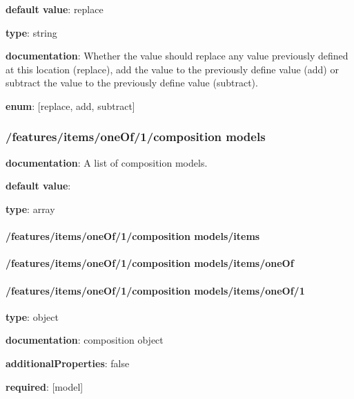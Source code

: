 \begin{itemized}
\item {\bf default value}: replace
\item {\bf type}: string
\item {\bf documentation}: Whether the value should replace any value previously defined at this location (replace), add the value to the previously define value (add) or subtract the value to the previously define value (subtract).
\item {\bf enum}: [replace, add, subtract]\end{itemized}\subsubsection{/features/items/oneOf/1/composition models} \begin{itemized}
\item {\bf documentation}: A list of composition models.
\item {\bf default value}: 
\item {\bf type}: array
\paragraph{/features/items/oneOf/1/composition models/items} \begin{itemized}
\end{itemized}\end{itemized}\paragraph{/features/items/oneOf/1/composition models/items/oneOf} \begin{itemized}
\end{itemized}\paragraph{/features/items/oneOf/1/composition models/items/oneOf/1} \begin{itemized}
\item {\bf type}: object
\item {\bf documentation}: composition object
\item {\bf additionalProperties}: false
\item {\bf required}: [model]\end{itemized}
